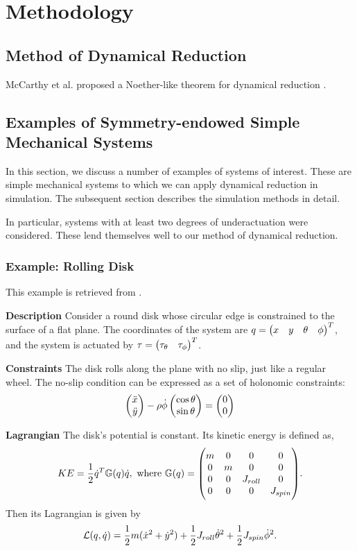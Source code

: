 \documentclass[main.tex]{subfiles}
\begin{document}
\chapter{Methodology}
\section{Method of Dynamical Reduction}
McCarthy et al. proposed a Noether-like theorem for dynamical reduction \cite{mccarthy}.


\section{Examples of Symmetry-endowed Simple Mechanical Systems}
In this section, we discuss a number of examples of systems of interest. These are simple mechanical systems to which we can apply dynamical reduction in simulation. The subsequent section describes the simulation methods in detail.

In particular, systems with at least two degrees of underactuation were considered. These lend themselves well to our method of dynamical reduction.

\subsection{Example: Rolling Disk}
This example is retrieved from \cite[9]{bullo2019geometric}.

\textbf{Description} Consider a round disk whose circular edge is constrained to the surface of a flat plane. The coordinates of the system are $q=\pmqty{x&y&\theta&\phi}^T$, and the system is actuated by $\tau=\pmqty{\tau_\theta&\tau_\phi}^T$.

\textbf{Constraints} The disk rolls along the plane with no slip, just like a regular wheel. The no-slip condition can be expressed as a set of holonomic constraints:
\begin{align}
    \pmqty{\ddot{x}\\\ddot{y}}-\rho\dot{\phi}\pmqty{\cos\theta\\\sin\theta}=\pmqty{\zmat{2}{1}}
\end{align}

\textbf{Lagrangian} The disk's potential is constant. Its kinetic energy is defined as,
\begin{align}
    KE = \frac{1}{2}\dot q^T \mathbb{G}(q) \dot q, \textrm{ where  }\mathbb{G}(q)=
\mqty(\dmat[0]{m,m,J_{roll},J_{spin}}).
\end{align}
Then its Lagrangian is given by
\begin{align}
    \mathcal{L}(q,\dot q)=\frac{1}{2}m(\dot x^2+\dot y^2)+\frac{1}{2}J_{roll}\dot\theta^2+\frac{1}{2}J_{spin}\dot{\phi}^2.
\end{align}
\end{document}
